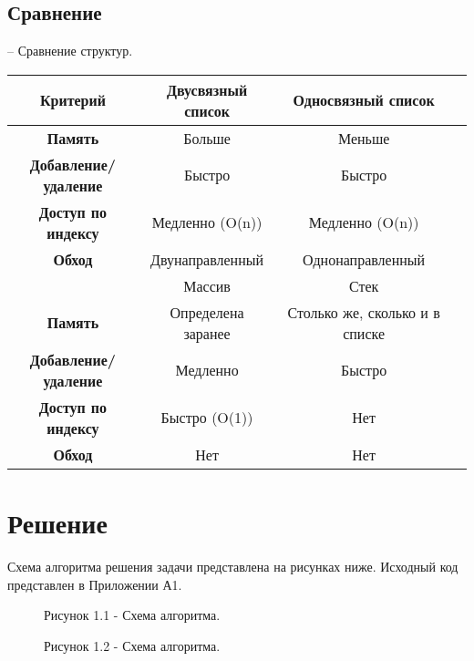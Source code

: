\documentclass[oneside,a4paper,14pt]{extarticle}
\begin{document}
\subsection*{Сравнение}
 – Сравнение структур.\\
\begin{tabular}{|c|c|c|c|}
	\hline
	Критерий                     & Двусвязный список  & Односвязный список             \\
	\hline
	\textbf{Память}              & Больше             & Меньше                         \\
	\textbf{Добавление/удаление} & Быстро             & Быстро                         \\
	\textbf{Доступ по индексу}   & Медленно (O(n))    & Медленно (O(n))                \\
	\textbf{Обход}               & Двунаправленный    & Однонаправленный               \\
	\hline
	                             & Массив             & Стек                           \\
	\hline
	\textbf{Память}              & Определена заранее & Столько же, сколько и в списке \\
	\textbf{Добавление/удаление} & Медленно           & Быстро                         \\
	\textbf{Доступ по индексу}   & Быстро (O(1))      & Нет                            \\
	\textbf{Обход}               & Нет                & Нет                            \\
    \hline
\end{tabular}

\section*{Решение}

Схема алгоритма решения задачи представлена на рисунках ниже. Исходный код представлен в Приложении А1.

\newpage
\begin{figure}[!ht]
	\centering
	\caption*{Рисунок 1.1 - Схема алгоритма.}
\end{figure}

\begin{figure}[!ht]
	\centering
	\caption*{Рисунок 1.2 - Схема алгоритма.}
\end{figure}
\end{document}
